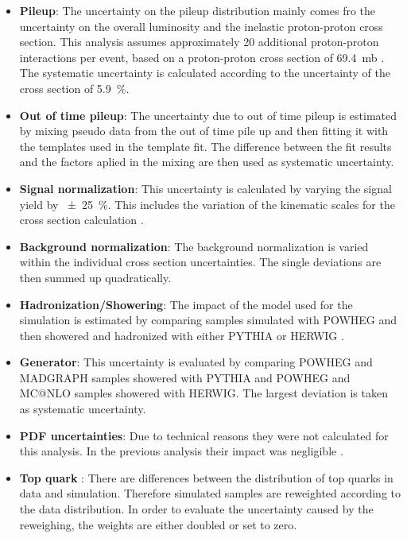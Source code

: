 \begin{itemize}
\item \textbf{Pileup}: The uncertainty on the pileup distribution mainly comes fro the uncertainty on the overall luminosity and the inelastic proton-proton cross section. This analysis assumes approximately 20 additional proton-proton interactions per event, based on a proton-proton cross section of \SI{69.4}{\milli \barn} \cite{Antchev:2011vs}. The systematic uncertainty is calculated according to the uncertainty of the cross section of \SI{5.9}{\percent}.  
\item \textbf{Out of time pileup}: The uncertainty due to out of time pileup is estimated by mixing pseudo data from the out of time pile up and then fitting it with the templates used in the template fit. The difference between the fit results and the factors aplied in the mixing are then used as systematic uncertainty.
\item \textbf{Signal normalization}: This uncertainty is calculated by varying the signal yield by \SI{\pm 25}{\percent}. This includes the variation of the kinematic scales for the cross section calculation \cite{Melnikov:2011ta}.
\item \textbf{Background normalization}: The background normalization is varied within the individual cross section uncertainties. The single deviations are then summed up quadratically.
\item \textbf{Hadronization/Showering}: The impact of the model used for the simulation is estimated by comparing samples simulated with POWHEG \cite{Alioli:2011as} \cite{Nason:2004rx} \cite{Frixione:2007vw} \cite{Alioli:2010xd} and then showered and hadronized with either PYTHIA \cite{Sjostrand:2006za} or HERWIG \cite{Corcella:2000bw}.
\item \textbf{Generator}: This uncertainty is evaluated by comparing POWHEG and MADGRAPH samples showered with PYTHIA and POWHEG and MC@NLO \cite{Frixione:2002ik} \cite{Frixione:2003ei} samples showered with HERWIG. The largest deviation is taken as systematic uncertainty.
\item \textbf{PDF uncertainties}: Due to technical reasons they were not calculated for this analysis. In the previous analysis their impact was negligible \cite{CMS-PAS-TOP-13-011}.
\item \textbf{Top quark \pt}: There are differences between the \pt distribution of top quarks in data and simulation. Therefore simulated samples are reweighted according to the data distribution. In order to evaluate the uncertainty caused by the reweighing, the weights are either doubled or set to zero.

\end{itemize}
